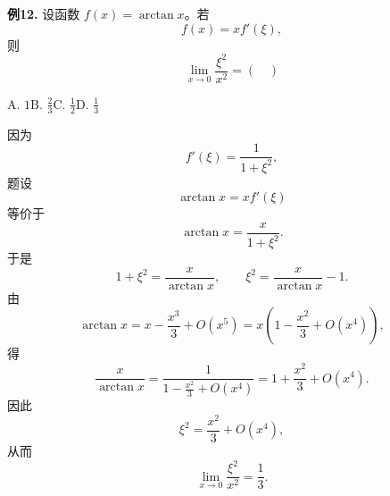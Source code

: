 \begin{problemblock}
\textbf{例12.} 设函数 \(f(x)=\arctan x\)。若
\[
f(x)=x f'(\xi),
\]
则
\[
\lim_{x\to0}\frac{\xi^2}{x^2}=(\quad)
\]

A. \(1\)\qquad B. \(\frac23\)\qquad C. \(\frac12\)\qquad D. \(\frac13\)
\end{problemblock}
\begin{solutionblock}
因为
\[
f'(\xi)=\frac1{1+\xi^2},
\]
题设
\[
\arctan x=x f'(\xi)
\]
等价于
\[
\arctan x=\frac{x}{1+\xi^2}.
\]
于是
\[
1+\xi^2=\frac{x}{\arctan x},
\qquad
\xi^2=\frac{x}{\arctan x}-1.
\]
由
\[
\arctan x=x-\frac{x^3}{3}+O(x^5)
=x\left(1-\frac{x^2}{3}+O(x^4)\right),
\]
得
\[
\frac{x}{\arctan x}
=\frac1{1-\frac{x^2}{3}+O(x^4)}
=1+\frac{x^2}{3}+O(x^4).
\]
因此
\[
\xi^2=\frac{x^2}{3}+O(x^4),
\]
从而
\[
\lim_{x\to0}\frac{\xi^2}{x^2}=\frac13.
\]
\end{solutionblock}
